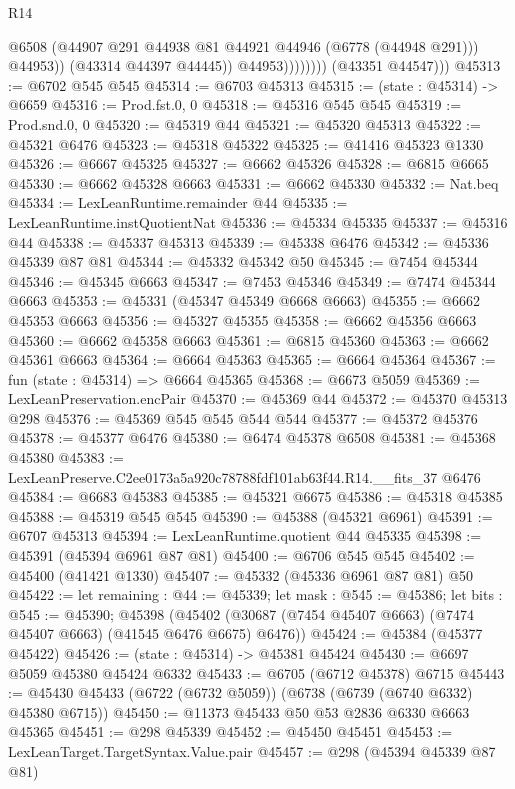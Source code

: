 \begin{lexlean}{R14}
\begin{coremodule}
                              @6508
                              (@44907 @291 @44938 @81 @44921 @44946 (@6778 (@44948 @291)))
                              @44953))
                          (@43314 @44397 @44445))
                        @44953))))))))
        (@43351 @44547)))
@45313 := @6702 @545 @545
@45314 := @6703 @45313
@45315 := (state : @45314) -> @6659
@45316 := Prod.fst.{0, 0}
@45318 := @45316 @545 @545
@45319 := Prod.snd.{0, 0}
@45320 := @45319 @44
@45321 := @45320 @45313
@45322 := @45321 @6476
@45323 := @45318 @45322
@45325 := @41416 @45323 @1330
@45326 := @6667 @45325
@45327 := @6662 @45326
@45328 := @6815 @6665
@45330 := @6662 @45328 @6663
@45331 := @6662 @45330
@45332 := Nat.beq
@45334 := LexLeanRuntime.remainder @44
@45335 := LexLeanRuntime.instQuotientNat
@45336 := @45334 @45335
@45337 := @45316 @44
@45338 := @45337 @45313
@45339 := @45338 @6476
@45342 := @45336 @45339 @87 @81
@45344 := @45332 @45342 @50
@45345 := @7454 @45344
@45346 := @45345 @6663
@45347 := @7453 @45346
@45349 := @7474 @45344 @6663
@45353 := @45331 (@45347 @45349 @6668 @6663)
@45355 := @6662 @45353 @6663
@45356 := @45327 @45355
@45358 := @6662 @45356 @6663
@45360 := @6662 @45358 @6663
@45361 := @6815 @45360
@45363 := @6662 @45361 @6663
@45364 := @6664 @45363
@45365 := @6664 @45364
@45367 := fun (state : @45314) => @6664 @45365
@45368 := @6673 @5059
@45369 := LexLeanPreservation.encPair
@45370 := @45369 @44
@45372 := @45370 @45313 @298
@45376 := @45369 @545 @545 @544 @544
@45377 := @45372 @45376
@45378 := @45377 @6476
@45380 := @6474 @45378 @6508
@45381 := @45368 @45380
@45383 := LexLeanPreserve.C2ee0173a5a920c78788fdf101ab63f44.R14.__fits_37 @6476
@45384 := @6683 @45383
@45385 := @45321 @6675
@45386 := @45318 @45385
@45388 := @45319 @545 @545
@45390 := @45388 (@45321 @6961)
@45391 := @6707 @45313
@45394 := LexLeanRuntime.quotient @44 @45335
@45398 := @45391 (@45394 @6961 @87 @81)
@45400 := @6706 @545 @545
@45402 := @45400 (@41421 @1330)
@45407 := @45332 (@45336 @6961 @87 @81) @50
@45422 := let remaining : @44 := @45339;
  let mask : @545 := @45386;
  let bits : @545 := @45390;
  @45398 (@45402 (@30687 (@7454 @45407 @6663) (@7474 @45407 @6663) (@41545 @6476 @6675) @6476))
@45424 := @45384 (@45377 @45422)
@45426 := (state : @45314) -> @45381 @45424
@45430 := @6697 @5059 @45380 @45424 @6332
@45433 := @6705 (@6712 @45378) @6715
@45443 := @45430 @45433 (@6722 (@6732 @5059)) (@6738 (@6739 (@6740 @6332) @45380 @6715))
@45450 := @11373 @45433 @50 @53 @2836 @6330 @6663 @45365
@45451 := @298 @45339
@45452 := @45450 @45451
@45453 := LexLeanTarget.TargetSyntax.Value.pair
@45457 := @298 (@45394 @45339 @87 @81)

\end{coremodule}
\end{lexlean}
